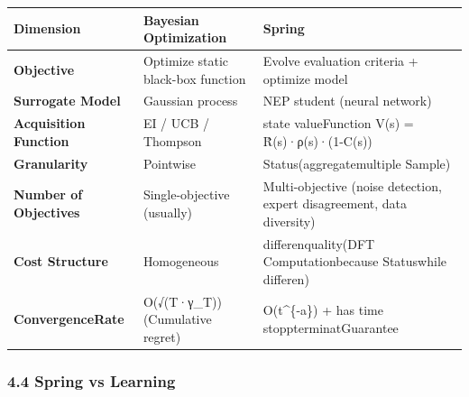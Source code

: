 \documentclass[
  12pt,
]{article}
\begin{document}
\begin{longtable}[]{@{}
  >{\raggedright\arraybackslash}p{}
  >{\raggedright\arraybackslash}p{}
  >{\raggedright\arraybackslash}p{}@{}}
\toprule\noalign{}
\begin{minipage}[b]{\linewidth}\raggedright
Dimension
\end{minipage} & \begin{minipage}[b]{\linewidth}\raggedright
Bayesian Optimization
\end{minipage} & \begin{minipage}[b]{\linewidth}\raggedright
Spring
\end{minipage} \\
\midrule\noalign{}
\endhead
\bottomrule\noalign{}
\endlastfoot
\textbf{Objective} & Optimize static black-box function & Evolve evaluation criteria + optimize model \\
\textbf{Surrogate Model} & Gaussian process & NEP student (neural network) \\
\textbf{Acquisition Function} & EI / UCB / Thompson & state valueFunction V(s) =
R̂(s)·ρ(s)·(1-C(s)) \\
\textbf{Granularity} & Pointwise & Status(aggregatemultiple Sample) \\
\textbf{Number of Objectives} & Single-objective (usually) &
Multi-objective (noise detection, expert disagreement, data diversity) \\
\textbf{Cost Structure} & Homogeneous & differenquality(DFT Computationbecause Statuswhile differen) \\
\textbf{ConvergenceRate} & O(√(T·γ\_T))(Cumulative regret) & O(t\^{}\{-a\}) +
has time stoppterminatGuarantee \\
\end{longtable}

\subsubsection{4.4 Spring vs
Learning}\label{spring-vs-ux4e3bux52a8ux5b66ux4e60}
\end{document}
